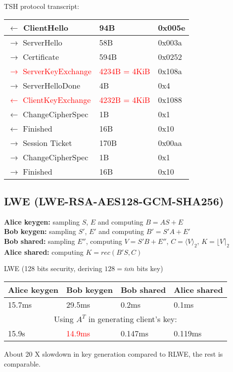 \documentclass[12pt]{article}
\newcommand{\nbar}{\overline{n}}
\newcommand{\mbar}{\overline{m}}
\begin{document}
TSH protocol transcript:
\begin{center}
    \begin{tabular}{| l | l | l |}
    \hline
    $\leftarrow$ ClientHello & 94B & 0x005e\\ \hline
    $\rightarrow$ ServerHello & 58B & 0x003a\\ \hline
    $\rightarrow$ Certificate & 594B & 0x0252\\ \hline
    \textcolor{red}{$\rightarrow$ ServerKeyExchange} & \textcolor{red}{4234B = 4KiB} & 0x108a\\ \hline
    $\rightarrow$ ServerHelloDone & 4B & 0x4\\ \hline
    \textcolor{red}{$\leftarrow$ ClientKeyExchange} & \textcolor{red}{4232B = 4KiB} & 0x1088\\ \hline
    $\leftarrow$ ChangeCipherSpec & 1B & 0x1\\ \hline
    $\leftarrow$ Finished & 16B & 0x10\\ \hline
    $\rightarrow$ Session Ticket & 170B & 0x00aa\\ \hline
    $\rightarrow$ ChangeCipherSpec & 1B & 0x1\\ \hline
    $\rightarrow$ Finished & 16B & 0x10\\ \hline
    \end{tabular}
\end{center}

\subsection{LWE \tiny{(LWE-RSA-AES128-GCM-SHA256)}}

\footnotesize{\textbf{Alice keygen:} sampling $S$, $E$ and computing $B = AS + E$\\
\textbf{Bob keygen:} sampling $S'$, $E'$ and computing $B' = S'A + E'$\\
\textbf{Bob shared:} sampling $E''$, computing $V = S'B + E''$, $C = \langle V \rangle_2$, $K = \lfloor V \rceil_2$\\
\textbf{Alice shared:} computing $K = rec(B'S, C)$\\}

LWE (128 bits security, deriving $128 = \nbar \mbar$ bits key)
\begin{center}
    \begin{tabular}{| l | l | l | l |}
    \hline
    Alice keygen & Bob keygen & Bob shared & Alice shared \\ \hline
    15.7ms & 29.5ms & 0.2ms & 0.1ms \\ \hline
    \multicolumn{4}{c}{Using $A^T$ in generating client's key:} \\ \hline
    15.9s &   \textcolor{red}{14.9ms} &   0.147ms &   0.119ms \\ \hline
    \end{tabular}
\end{center}
About 20 X slowdown in key generation compared to RLWE, the rest is comparable.
\end{document}
